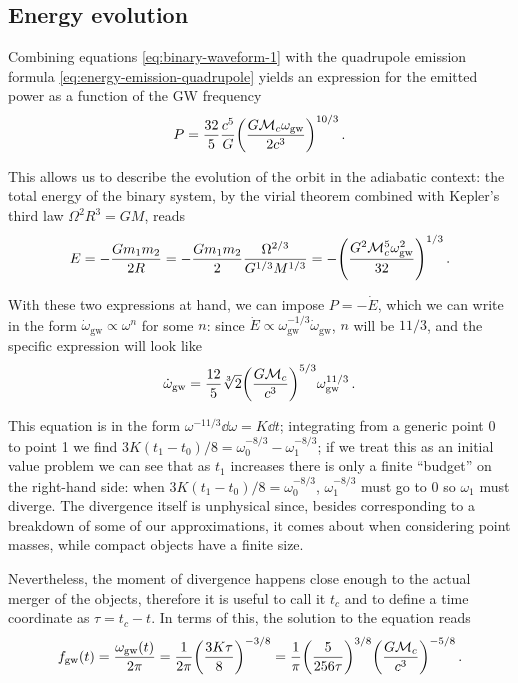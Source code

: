 \documentclass[main.tex]{subfiles}
\begin{document}
\subsection{Energy evolution}

Combining equations \eqref{eq:binary-waveform-1} with the quadrupole emission formula \eqref{eq:energy-emission-quadrupole} yields an expression for the emitted power as a function of the \ac{GW} frequency
%
\begin{align}
P = \frac{32}{5} \frac{c^{5}}{G} \qty(\frac{G \mathcal{M}_c \omega_{\text{gw}}}{2 c^3})^{10/3}
\,.
\end{align}

This allows us to describe the evolution of the orbit in the adiabatic context: the total energy of the binary system, by the virial theorem combined with Kepler's third law \(\Omega^2 R^3 = G M\), reads 
%
\begin{align}
E = - \frac{G m_1 m_2 }{2R}  = - \frac{G m_1 m_2 }{2} \frac{\Omega^{2/3}}{G^{1/3} M^{1/3}} = - \qty( \frac{G^2 \mathcal{M}_c^{5} \omega^2 _{\text{gw}}}{32} )^{1/3}
\,.
\end{align}

With these two expressions at hand, we can impose \(P = -  \dot{E}\), which we can write in the form \(\dot{\omega} _{\text{gw}} \propto \omega^{n}\) for some \(n\): since \(\dot{E}\propto \omega _{\text{gw}}^{-1/3} \dot{\omega} _{\text{gw}}\), \(n\) will be \(11/3\), and the specific expression will look like 
%
\begin{align}
\dot{\omega} _{\text{gw}} = \frac{12}{5} \sqrt[3]{2} \qty( \frac{G \mathcal{M}_c}{c^3})^{5/3} \omega _{\text{gw}}^{11/3}
\,.
\end{align}

This equation is in the form \(\omega^{-11/3} \dd{\omega } = K \dd{t}\); integrating from a generic point 0 to point 1 we find \(3K(t_1 - t_0 ) / 8 = \omega_0^{-8/3} - \omega_1^{-8/3}\); if we treat this as an initial value problem we can see that as \(t_1 \) increases there is only a finite ``budget'' on the right-hand side: when \(3K (t_1 - t_0 ) / 8 = \omega_0^{-8/3}\), \(\omega_1^{-8/3}\) must go to 0 so \(\omega_1 \) must diverge. 
The divergence itself is unphysical since, besides corresponding to a breakdown of some of our approximations, it comes about when considering point masses, while compact objects have a finite size. 

Nevertheless, the moment of divergence happens close enough to the actual merger of the objects, therefore it is useful to call it \(t_c\) and to define a time coordinate as \(\tau = t_c - t\).
In terms of this, the solution to the equation reads 
%
\begin{align} \label{eq:gw-frequency-0PN}
f _{\text{gw}} (t) = \frac{\omega _{\text{gw}} (t)}{2 \pi } = \frac{1}{2 \pi }\qty( \frac{ 3 K \tau }{8})^{-3/8} = \frac{1}{\pi } \qty(\frac{ 5}{256 \tau })^{3/8} \qty(\frac{G \mathcal{M}_c}{c^3})^{-5/8}
\,.
\end{align}
\end{document}
